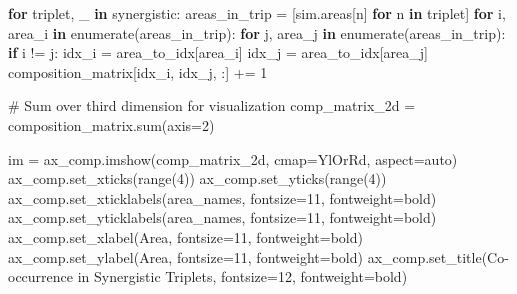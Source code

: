 \documentclass[
  11pt,
  letterpaper,
  oneside,
  openany]{book}
\newenvironment{Shaded}{\begin{snugshade}}{\end{snugshade}}
\newcommand{\BuiltInTok}[1]{\textcolor[rgb]{0.00,0.23,0.31}{#1}}
\newcommand{\CommentTok}[1]{\textcolor[rgb]{0.37,0.37,0.37}{#1}}
\newcommand{\ControlFlowTok}[1]{\textcolor[rgb]{0.00,0.23,0.31}{\textbf{#1}}}
\newcommand{\DecValTok}[1]{\textcolor[rgb]{0.68,0.00,0.00}{#1}}
\newcommand{\KeywordTok}[1]{\textcolor[rgb]{0.00,0.23,0.31}{\textbf{#1}}}
\newcommand{\NormalTok}[1]{\textcolor[rgb]{0.00,0.23,0.31}{#1}}
\newcommand{\OperatorTok}[1]{\textcolor[rgb]{0.37,0.37,0.37}{#1}}
\newcommand{\StringTok}[1]{\textcolor[rgb]{0.13,0.47,0.30}{#1}}
\begin{document}
\begin{Shaded}
\begin{Highlighting}[]
\ControlFlowTok{for}\NormalTok{ triplet, \_ }\KeywordTok{in}\NormalTok{ synergistic:}
\NormalTok{    areas\_in\_trip }\OperatorTok{=}\NormalTok{ [sim.areas[n] }\ControlFlowTok{for}\NormalTok{ n }\KeywordTok{in}\NormalTok{ triplet]}
    \ControlFlowTok{for}\NormalTok{ i, area\_i }\KeywordTok{in} \BuiltInTok{enumerate}\NormalTok{(areas\_in\_trip):}
        \ControlFlowTok{for}\NormalTok{ j, area\_j }\KeywordTok{in} \BuiltInTok{enumerate}\NormalTok{(areas\_in\_trip):}
            \ControlFlowTok{if}\NormalTok{ i }\OperatorTok{!=}\NormalTok{ j:}
\NormalTok{                idx\_i }\OperatorTok{=}\NormalTok{ area\_to\_idx[area\_i]}
\NormalTok{                idx\_j }\OperatorTok{=}\NormalTok{ area\_to\_idx[area\_j]}
\NormalTok{                composition\_matrix[idx\_i, idx\_j, :] }\OperatorTok{+=} \DecValTok{1}

\CommentTok{\# Sum over third dimension for visualization}
\NormalTok{comp\_matrix\_2d }\OperatorTok{=}\NormalTok{ composition\_matrix.}\BuiltInTok{sum}\NormalTok{(axis}\OperatorTok{=}\DecValTok{2}\NormalTok{)}

\NormalTok{im }\OperatorTok{=}\NormalTok{ ax\_comp.imshow(comp\_matrix\_2d, cmap}\OperatorTok{=}\StringTok{\textquotesingle{}YlOrRd\textquotesingle{}}\NormalTok{, aspect}\OperatorTok{=}\StringTok{\textquotesingle{}auto\textquotesingle{}}\NormalTok{)}
\NormalTok{ax\_comp.set\_xticks(}\BuiltInTok{range}\NormalTok{(}\DecValTok{4}\NormalTok{))}
\NormalTok{ax\_comp.set\_yticks(}\BuiltInTok{range}\NormalTok{(}\DecValTok{4}\NormalTok{))}
\NormalTok{ax\_comp.set\_xticklabels(area\_names, fontsize}\OperatorTok{=}\DecValTok{11}\NormalTok{, fontweight}\OperatorTok{=}\StringTok{\textquotesingle{}bold\textquotesingle{}}\NormalTok{)}
\NormalTok{ax\_comp.set\_yticklabels(area\_names, fontsize}\OperatorTok{=}\DecValTok{11}\NormalTok{, fontweight}\OperatorTok{=}\StringTok{\textquotesingle{}bold\textquotesingle{}}\NormalTok{)}
\NormalTok{ax\_comp.set\_xlabel(}\StringTok{\textquotesingle{}Area\textquotesingle{}}\NormalTok{, fontsize}\OperatorTok{=}\DecValTok{11}\NormalTok{, fontweight}\OperatorTok{=}\StringTok{\textquotesingle{}bold\textquotesingle{}}\NormalTok{)}
\NormalTok{ax\_comp.set\_ylabel(}\StringTok{\textquotesingle{}Area\textquotesingle{}}\NormalTok{, fontsize}\OperatorTok{=}\DecValTok{11}\NormalTok{, fontweight}\OperatorTok{=}\StringTok{\textquotesingle{}bold\textquotesingle{}}\NormalTok{)}
\NormalTok{ax\_comp.set\_title(}\StringTok{\textquotesingle{}Co{-}occurrence in Synergistic Triplets\textquotesingle{}}\NormalTok{, }
\NormalTok{                 fontsize}\OperatorTok{=}\DecValTok{12}\NormalTok{, fontweight}\OperatorTok{=}\StringTok{\textquotesingle{}bold\textquotesingle{}}\NormalTok{)}


\end{Highlighting}
\end{Shaded}
\end{document}
